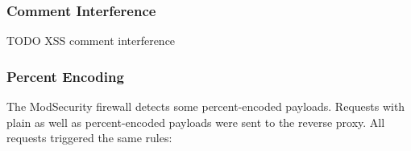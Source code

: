 \subsubsection{Comment Interference}
{\color{red}TODO XSS comment interference}
%
%
%
%
%
%
%

\subsubsection{Percent Encoding}
The ModSecurity firewall detects some percent-encoded payloads. Requests with plain as well as percent-encoded payloads were sent to the reverse proxy. All requests triggered the same rules:

